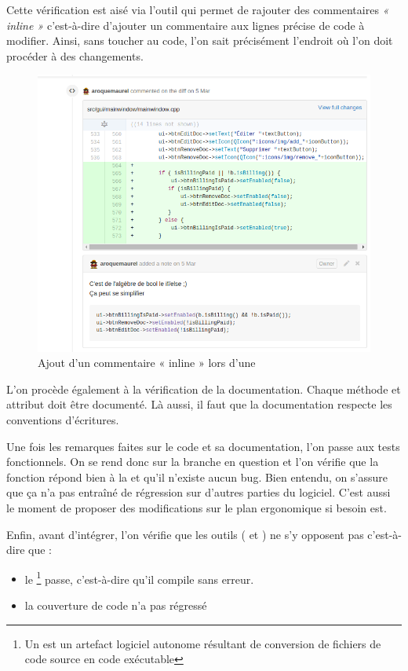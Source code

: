 Cette vérification est aisé via l'outil \Github{} qui permet de rajouter des commentaires \textit{« inline »} c'est-à-dire d'ajouter un commentaire aux lignes précise de code à modifier. Ainsi, sans toucher au code, l'on sait précisément l'endroit où l'on doit procéder à des changements. 
\begin{figure}[H]
	\centering
	\includegraphics[width=0.7\linewidth]{screens/comments_inline}
	\caption{Ajout d'un commentaire « inline » lors d'une \PullRequest}
	\label{fig:comments_inline}
\end{figure}

L'on procède également à la vérification de la documentation. Chaque méthode et attribut doit être documenté. Là aussi, il faut que la documentation respecte les conventions d'écritures. 

Une fois les remarques faites sur le code et sa documentation, l'on passe aux tests fonctionnels. On se rend donc sur la branche \Git{} en question et l'on vérifie que la fonction répond bien à la \UserStory{} et qu'il n'existe aucun bug. Bien entendu, on s'assure que ça n'a pas entraîné de régression sur d'autres parties du logiciel. C'est aussi le moment de proposer des modifications sur le plan ergonomique si besoin est.  

Enfin, avant d'intégrer, l'on vérifie que les outils (\Travis{} et \Coveralls) ne s'y opposent pas c'est-à-dire que :
\begin{itemize}
	\item le \Build{}\footnote{Un \Build est un artefact logiciel autonome résultant de conversion de fichiers de code source en code exécutable} passe, c'est-à-dire qu'il compile sans erreur.
	\item la couverture de code n'a pas régressé 
\end{itemize}